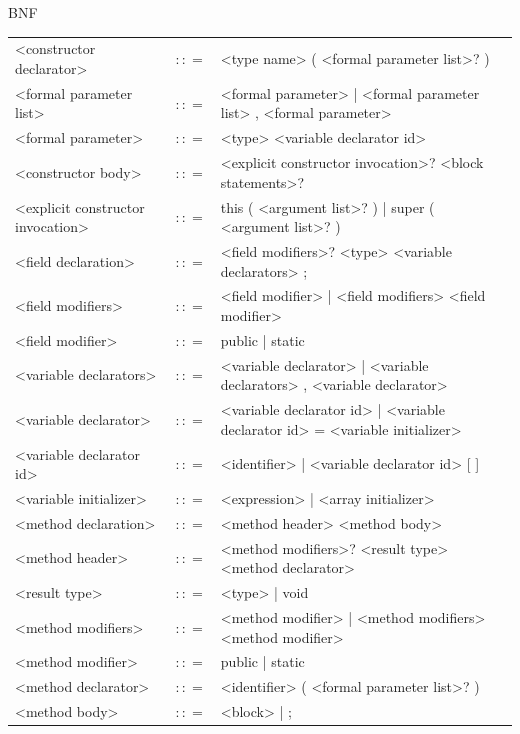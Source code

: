 \documentclass[landscape, 11pt]{article}
\begin{document}
\begin{qsection}{BNF}
\begin{enumerate}[label=\bt{\theenumi.}]
\begin{longtable}{R{7cm} c L{15cm}}
				<constructor declarator>					&	$\colon\colon=$	&	<type name> ( <formal parameter list>? )
				\\
				<formal parameter list>						&	$\colon\colon=$	&	<formal parameter> | <formal parameter list> , <formal parameter>
				\\
				<formal parameter>							&	$\colon\colon=$	&	<type> <variable declarator id>
				\\
				<constructor body>							&	$\colon\colon=$	&	{ <explicit constructor invocation>? <block statements>? }
				\\
				<explicit constructor invocation>			&	$\colon\colon=$	&	this ( <argument list>? ) | super ( <argument list>? )
				\\
				<field declaration>							&	$\colon\colon=$	&	<field modifiers>? <type> <variable declarators> ;
				\\
				<field modifiers>							&	$\colon\colon=$	&	<field modifier> | <field modifiers> <field modifier>
				\\
				<field modifier>							&	$\colon\colon=$	&	public | static
				\\
				<variable declarators>						&	$\colon\colon=$	&	<variable declarator> | <variable declarators> , <variable declarator>
				\\
				<variable declarator>						&	$\colon\colon=$	&	<variable declarator id> | <variable declarator id> = <variable initializer>
				\\
				<variable declarator id>					&	$\colon\colon=$	&	<identifier> | <variable declarator id> [ ]
				\\
				<variable initializer>						&	$\colon\colon=$	&	<expression> | <array initializer>
				\\
				<method declaration>						&	$\colon\colon=$	&	<method header> <method body>
				\\
				<method header>								&	$\colon\colon=$	&	<method modifiers>? <result type> <method declarator>
				\\
				<result type>								&	$\colon\colon=$	&	<type> | void
				\\
				<method modifiers>							&	$\colon\colon=$	&	<method modifier> | <method modifiers> <method modifier>
				\\
				<method modifier>							&	$\colon\colon=$	&	public | static
				\\
				<method declarator>							&	$\colon\colon=$	&	<identifier> ( <formal parameter list>? )
				\\
				<method body>								&	$\colon\colon=$	&	<block> | ;

\end{longtable}
\end{enumerate}
\end{qsection}
\end{document}
